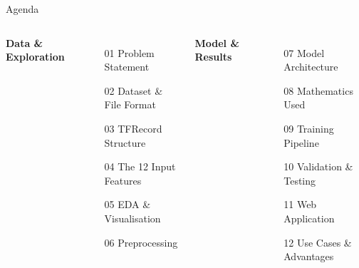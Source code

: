 ﻿\documentclass[aspectratio=169,t]{beamer}
\begin{document}
\begin{frame}{Agenda}
\begin{columns}[t]
\textcolor{accent}{\textbf{Data \& Exploration}}
\begin{itemize}\setlength\itemsep{6pt}
  \item[{\textcolor{firered}{01}}] Problem Statement
  \item[{\textcolor{accent}{02}}] Dataset \& File Format
  \item[{\textcolor{accent}{03}}] TFRecord Structure
  \item[{\textcolor{accent}{04}}] The 12 Input Features
  \item[{\textcolor{accentgreen}{05}}] EDA \& Visualisation
  \item[{\textcolor{accentgreen}{06}}] Preprocessing
\end{itemize}
\textcolor{accent}{\textbf{Model \& Results}}
\begin{itemize}\setlength\itemsep{6pt}
  \item[{\textcolor{accentyellow}{07}}] Model Architecture
  \item[{\textcolor{accentyellow}{08}}] Mathematics Used
  \item[{\textcolor{accentyellow}{09}}] Training Pipeline
  \item[{\textcolor{fireorange}{10}}] Validation \& Testing
  \item[{\textcolor{firered}{11}}] Web Application
  \item[{\textcolor{firered}{12}}] Use Cases \& Advantages
\end{itemize}
\end{columns}
\end{frame}
\end{document}
